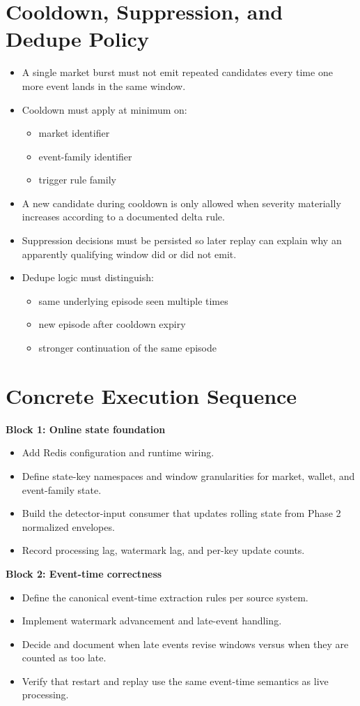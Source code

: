 \documentclass{article}
\begin{document}
\section*{Cooldown, Suppression, and Dedupe Policy}
\begin{itemize}
\item A single market burst must not emit repeated candidates every time one more event lands in the same window.
\item Cooldown must apply at minimum on:
\begin{itemize}
\item market identifier
\item event-family identifier
\item trigger rule family
\end{itemize}
\item A new candidate during cooldown is only allowed when severity materially increases according to a documented delta rule.
\item Suppression decisions must be persisted so later replay can explain why an apparently qualifying window did or did not emit.
\item Dedupe logic must distinguish:
\begin{itemize}
\item same underlying episode seen multiple times
\item new episode after cooldown expiry
\item stronger continuation of the same episode
\end{itemize}
\end{itemize}

\section*{Concrete Execution Sequence}
\textbf{Block 1: Online state foundation}
\begin{itemize}
\item Add Redis configuration and runtime wiring.
\item Define state-key namespaces and window granularities for market, wallet, and event-family state.
\item Build the detector-input consumer that updates rolling state from Phase 2 normalized envelopes.
\item Record processing lag, watermark lag, and per-key update counts.
\end{itemize}

\textbf{Block 2: Event-time correctness}
\begin{itemize}
\item Define the canonical event-time extraction rules per source system.
\item Implement watermark advancement and late-event handling.
\item Decide and document when late events revise windows versus when they are counted as too late.
\item Verify that restart and replay use the same event-time semantics as live processing.
\end{itemize}
\end{document}
